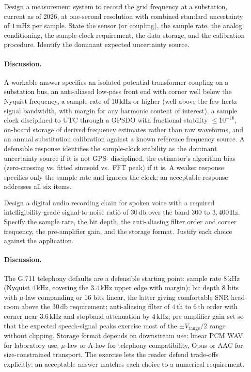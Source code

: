 \begin{exercise}
Design a measurement system to record the grid frequency at a
substation, current as of 2026, at one-second resolution with
combined standard uncertainty of $1 \,\si{\milli\hertz}$ per
sample. State the sensor (or coupling), the sample rate, the
analog conditioning, the sample-clock requirement, the data
storage, and the calibration procedure. Identify the dominant
expected uncertainty source.

\paragraph{Discussion.}
A workable answer specifies an isolated potential-transformer
coupling on a substation bus, an anti-aliased low-pass front end
with corner well below the Nyquist frequency, a sample rate of
$10 \,\si{\kilo\hertz}$ or higher (well above the few-hertz
signal bandwidth, with margin for any harmonic content of
interest), a sample clock disciplined to UTC through a GPSDO with
fractional stability $\leq 10^{-10}$, on-board storage of derived
frequency estimates rather than raw waveforms, and an annual
substitution calibration against a known reference frequency
source. A defensible response identifies the sample-clock
stability as the dominant uncertainty source if it is not GPS-
disciplined, the estimator's algorithm bias (zero-crossing vs.
fitted sinusoid vs.\ FFT peak) if it is. A weaker response
specifies only the sample rate and ignores the clock; an
acceptable response addresses all six items.
\end{exercise}

\begin{exercise}
Design a digital audio recording chain for spoken voice with a
required intelligibility-grade signal-to-noise ratio of
$30 \,\si{\decibel}$ over the band $300$ to $3{,}400 \,\si{\hertz}$.
Specify the sample rate, the bit depth, the anti-aliasing filter
order and corner frequency, the pre-amplifier gain, and the
storage format. Justify each choice against the application.

\paragraph{Discussion.}
The G.711 telephony defaults are a defensible starting point:
sample rate $8 \,\si{\kilo\hertz}$ (Nyquist $4 \,\si{\kilo\hertz}$,
covering the $3.4 \,\si{\kilo\hertz}$ upper edge with margin);
bit depth $8$ bits with $\mu$-law companding or $16$ bits linear,
the latter giving comfortable SNR head-room above the
$30 \,\si{\decibel}$ requirement; anti-aliasing filter of $4\,
\text{th}$ to $6\,\text{th}$ order with corner near $3.6 \,\si
{\kilo\hertz}$ and stopband attenuation by $4 \,\si{\kilo\hertz}$;
pre-amplifier gain set so that the expected speech-signal peaks
exercise most of the $\pm V_{\text{range}}/2$ range without
clipping. Storage format depends on downstream use: linear PCM
WAV for laboratory use, $\mu$-law or A-law for telephony
compatibility, Opus or AAC for size-constrained transport. The
exercise lets the reader defend trade-offs explicitly; an
acceptable answer matches each choice to a numerical requirement.
\end{exercise}

